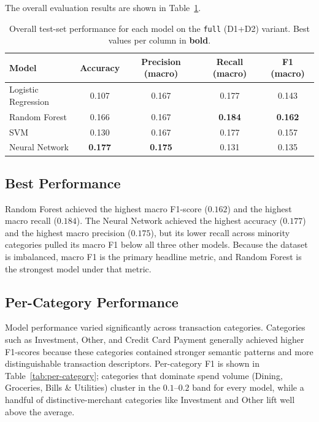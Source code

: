 \documentclass[11pt]{article}
\begin{document}
The overall evaluation results are shown in Table~\ref{tab:overall-results}.

\begin{table}[!htbp]
\centering
\caption{Overall test-set performance for each model on the
\texttt{full} (D1+D2) variant. Best values per column in \textbf{bold}.}
\label{tab:overall-results}
\begin{tabular}{lcccc}
\toprule
Model & Accuracy & Precision (macro) & Recall (macro) & F1 (macro) \\
\midrule
Logistic Regression & 0.107          & 0.167          & 0.177          & 0.143          \\
Random Forest       & 0.166          & 0.167          & \textbf{0.184} & \textbf{0.162} \\
SVM                 & 0.130          & 0.167          & 0.177          & 0.157          \\
Neural Network      & \textbf{0.177} & \textbf{0.175} & 0.131          & 0.135          \\
\bottomrule
\end{tabular}
\end{table}

\subsection{Best Performance}

Random Forest achieved the highest macro F1-score ($0.162$) and the highest
macro recall ($0.184$). The Neural Network achieved the highest accuracy
($0.177$) and the highest macro precision ($0.175$), but its lower recall
across minority categories pulled its macro F1 below all three other models.
Because the dataset is imbalanced, macro F1 is the primary headline metric,
and Random Forest is the strongest model under that metric.

\subsection{Per-Category Performance}

Model performance varied significantly across transaction categories.
Categories such as Investment, Other, and Credit Card Payment generally
achieved higher F1-scores because these categories contained stronger
semantic patterns and more distinguishable transaction descriptors.
Per-category F1 is shown in Table~\ref{tab:per-category}; categories that
dominate spend volume (Dining, Groceries, Bills \& Utilities) cluster in
the $0.1$--$0.2$ band for every model, while a handful of
distinctive-merchant categories like Investment and Other lift well above
the average.
\end{document}
